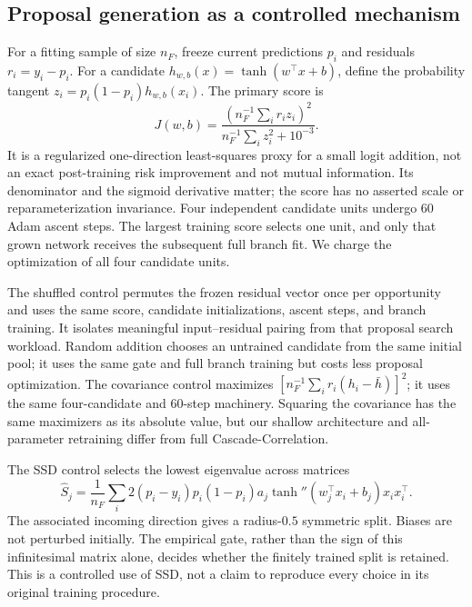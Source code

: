 \documentclass[11pt]{article}
\theoremstyle{remark}\newtheorem{remark}[theorem]{Remark}
\begin{document}
\subsection{Proposal generation as a controlled mechanism}
For a fitting sample of size $n_F$, freeze current predictions $p_i$ and
residuals $r_i=y_i-p_i$. For a candidate $h_{w,b}(x)=\tanh(w^\top x+b)$,
define the probability tangent $z_i=p_i(1-p_i)h_{w,b}(x_i)$. The primary
score is
\begin{equation}
 J(w,b)=\frac{(n_F^{-1}\sum_i r_i z_i)^2}
                   {n_F^{-1}\sum_i z_i^2+10^{-3}}.
 \label{eq:proposal-score}
\end{equation}
It is a regularized one-direction least-squares proxy for a small logit
addition, not an exact post-training risk improvement and not mutual
information. Its denominator and the sigmoid derivative matter; the score
has no asserted scale or reparameterization invariance. Four independent
candidate units undergo 60 Adam ascent steps. The largest training score
selects one unit, and only that grown network receives the subsequent full
branch fit. We charge the optimization of all four candidate units.

The shuffled control permutes the frozen residual vector once per opportunity
and uses the same score, candidate initializations, ascent steps, and branch
training. It isolates meaningful input--residual pairing from that proposal
search workload. Random addition chooses an untrained candidate from the same
initial pool; it uses the same gate and full branch training but costs less
proposal optimization. The covariance control maximizes
$[n_F^{-1}\sum_i r_i(h_i-\bar h)]^2$; it uses the same four-candidate and
60-step machinery. Squaring the covariance has the same maximizers as its
absolute value, but our shallow architecture and all-parameter retraining
differ from full Cascade-Correlation.

The SSD control selects the lowest eigenvalue across matrices
\begin{equation}
 \widehat S_j=\frac1{n_F}\sum_i
 2(p_i-y_i)p_i(1-p_i)a_j\tanh''(w_j^\top x_i+b_j)x_ix_i^\top.
\end{equation}
The associated incoming direction gives a radius-$0.5$ symmetric split.
Biases are not perturbed initially. The empirical gate, rather than the sign
of this infinitesimal matrix alone, decides whether the finitely trained
split is retained. This is a controlled use of SSD, not a claim to reproduce
every choice in its original training procedure.
\end{document}
